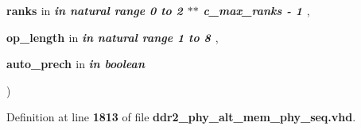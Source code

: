 {\begin{DoxyParamCaption}
\item[{}]{{\bfseries \textcolor{vhdlchar}{ranks}\textcolor{vhdlchar}{ }}\textcolor{stringliteral}{in} {\em {\bfseries \textcolor{keywordflow}{in}\textcolor{vhdlchar}{ }\textcolor{comment}{natural}\textcolor{vhdlchar}{ }\textcolor{vhdlchar}{ }\textcolor{vhdlchar}{ }\textcolor{keywordflow}{range}\textcolor{vhdlchar}{ }\textcolor{vhdlchar}{ } \textcolor{vhdldigit}{0} \textcolor{vhdlchar}{ }\textcolor{keywordflow}{to}\textcolor{vhdlchar}{ }\textcolor{vhdlchar}{ } \textcolor{vhdldigit}{2} \textcolor{vhdlchar}{$\ast$}\textcolor{vhdlchar}{$\ast$}\textcolor{vhdlchar}{ }\textcolor{vhdlchar}{ }\textcolor{vhdlchar}{ }{\bfseries {\bf c\+\_\+max\+\_\+ranks}} \textcolor{vhdlchar}{-\/}\textcolor{vhdlchar}{ } \textcolor{vhdldigit}{1} \textcolor{vhdlchar}{ }}} , }
\item[{}]{{\bfseries \textcolor{vhdlchar}{op\+\_\+length}\textcolor{vhdlchar}{ }}\textcolor{stringliteral}{in} {\em {\bfseries \textcolor{keywordflow}{in}\textcolor{vhdlchar}{ }\textcolor{comment}{natural}\textcolor{vhdlchar}{ }\textcolor{vhdlchar}{ }\textcolor{vhdlchar}{ }\textcolor{keywordflow}{range}\textcolor{vhdlchar}{ }\textcolor{vhdlchar}{ } \textcolor{vhdldigit}{1} \textcolor{vhdlchar}{ }\textcolor{keywordflow}{to}\textcolor{vhdlchar}{ }\textcolor{vhdlchar}{ } \textcolor{vhdldigit}{8} \textcolor{vhdlchar}{ }}} , }
\item[{}]{{\bfseries \textcolor{vhdlchar}{auto\+\_\+prech}\textcolor{vhdlchar}{ }}\textcolor{stringliteral}{in} {\em {\bfseries \textcolor{keywordflow}{in}\textcolor{vhdlchar}{ }\textcolor{comment}{boolean}\textcolor{vhdlchar}{ }\textcolor{vhdlchar}{ }\textcolor{vhdlchar}{ }}}}
\end{DoxyParamCaption}
)\hspace{0.3cm}{\ttfamily [Function]}}\label{classddr2__phy__alt__mem__phy__addr__cmd__pkg_a54ccdb29a605bdd215d0f966bca08f64}


Definition at line {\bf 1813} of file {\bf ddr2\+\_\+phy\+\_\+alt\+\_\+mem\+\_\+phy\+\_\+seq.\+vhd}.


